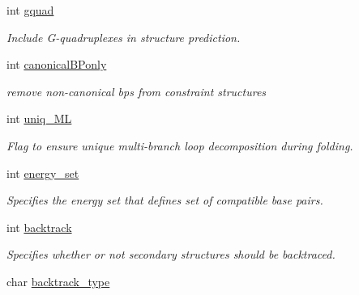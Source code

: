 \begin{DoxyCompactItemize}
int \mbox{\hyperlink{structvrna__md__s_af88a511a2b1f526b4c6213de6cb8fd6e}{gquad}}
\begin{DoxyCompactList}\small\item\em Include G-\/quadruplexes in structure prediction. \end{DoxyCompactList}\item 
\mbox{\label{structvrna__md__s_a87edce006e9daff84363ec0e6abd2182}} 
int \mbox{\hyperlink{structvrna__md__s_a87edce006e9daff84363ec0e6abd2182}{canonical\+B\+Ponly}}
\begin{DoxyCompactList}\small\item\em remove non-\/canonical bp\textquotesingle{}s from constraint structures \end{DoxyCompactList}\item 
\mbox{\label{structvrna__md__s_ade065b814a4e2e72ead93ab502613ed2}} 
int \mbox{\hyperlink{structvrna__md__s_ade065b814a4e2e72ead93ab502613ed2}{uniq\+\_\+\+ML}}
\begin{DoxyCompactList}\small\item\em Flag to ensure unique multi-\/branch loop decomposition during folding. \end{DoxyCompactList}\item 
\mbox{\label{structvrna__md__s_a5eee4e3b468eb690d1407e0178dafb3f}} 
int \mbox{\hyperlink{structvrna__md__s_a5eee4e3b468eb690d1407e0178dafb3f}{energy\+\_\+set}}
\begin{DoxyCompactList}\small\item\em Specifies the energy set that defines set of compatible base pairs. \end{DoxyCompactList}\item 
\mbox{\label{structvrna__md__s_a31f4471608cbdd03887f63c281823adb}} 
int \mbox{\hyperlink{structvrna__md__s_a31f4471608cbdd03887f63c281823adb}{backtrack}}
\begin{DoxyCompactList}\small\item\em Specifies whether or not secondary structures should be backtraced. \end{DoxyCompactList}\item 
\mbox{\label{structvrna__md__s_abb265da25121d22ed11c8435861f0e53}} 
char \mbox{\hyperlink{structvrna__md__s_abb265da25121d22ed11c8435861f0e53}{backtrack\+\_\+type}}

\end{DoxyCompactItemize}
